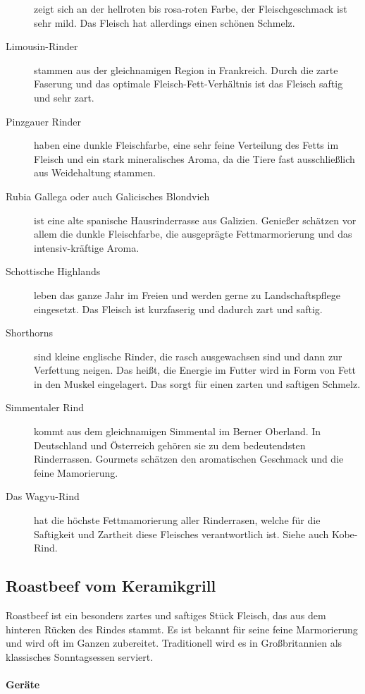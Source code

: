 \begin{description}
	zeigt sich an der hellroten bis rosa-roten Farbe, der Fleischgeschmack 
	ist sehr mild. Das Fleisch hat allerdings einen schönen Schmelz.
	\item[Limousin-Rinder] stammen aus der gleichnamigen Region in 
	Frankreich. Durch die zarte Faserung und das optimale 
	Fleisch-Fett-Verhältnis ist das Fleisch saftig und sehr zart.
	\item [Pinzgauer Rinder] haben eine dunkle Fleischfarbe, eine sehr 
	feine Verteilung des Fetts im Fleisch und ein stark mineralisches 
	Aroma, da die Tiere fast ausschließlich aus Weidehaltung stammen.
	\item [Rubia Gallega oder auch Galicisches Blondvieh] ist eine alte 
	spanische Hausrinderrasse aus Galizien. Genießer schätzen vor allem 
	die dunkle Fleischfarbe, die ausgeprägte Fettmarmorierung und das 
	intensiv-kräftige Aroma.
	\item [Schottische Highlands] leben das ganze Jahr im Freien und 
	werden gerne zu Landschaftspflege eingesetzt. Das Fleisch ist 
	kurzfaserig und dadurch zart und saftig.
	\item[Shorthorns] sind kleine englische Rinder, die rasch 
	ausgewachsen sind und dann zur Verfettung neigen. Das heißt, die 
	Energie im Futter wird in Form von Fett in den Muskel eingelagert. Das 
	sorgt für einen zarten und saftigen Schmelz.
	\item[Simmentaler Rind] kommt aus dem gleichnamigen Simmental im 
	Berner Oberland. In Deutschland und Österreich gehören sie zu dem 
	bedeutendsten Rinderrassen. Gourmets schätzen den aromatischen 
	Geschmack und die feine Mamorierung.
	\item[Das Wagyu-Rind] hat die höchste Fettmamorierung aller 
	Rinderrasen, welche für die Saftigkeit und Zartheit diese Fleisches 
	verantwortlich ist. Siehe auch Kobe-Rind.
\end{description}

\subsection{Roastbeef vom Keramikgrill}
Roastbeef ist ein besonders zartes und saftiges Stück Fleisch, das aus 
dem hinteren Rücken des Rindes stammt. Es ist bekannt für seine feine 
Marmorierung und wird oft im Ganzen zubereitet. Traditionell wird es in 
Großbritannien als klassisches Sonntagsessen serviert. 

\paragraph{Geräte}

